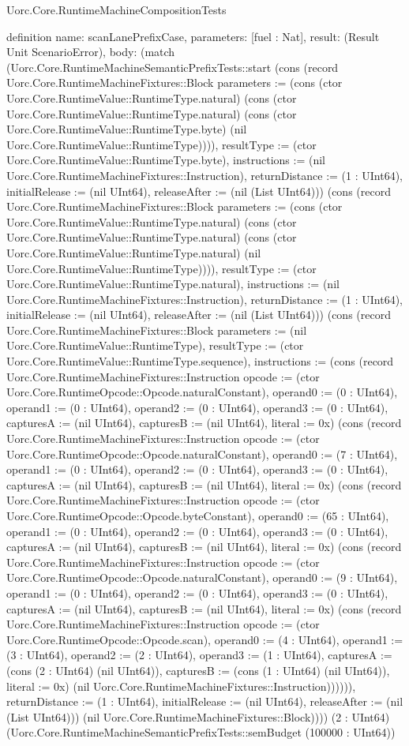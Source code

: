 \begin{lexlean}{Uorc.Core.RuntimeMachineCompositionTests}
\begin{semanticmodule}
definition{
  name: scanLanePrefixCase,
  parameters: [fuel : Nat],
  result: (Result Unit ScenarioError),
  body: (match (Uorc.Core.RuntimeMachineSemanticPrefixTests::start (cons (record Uorc.Core.RuntimeMachineFixtures::Block {parameters := (cons (ctor Uorc.Core.RuntimeValue::RuntimeType.natural) (cons (ctor Uorc.Core.RuntimeValue::RuntimeType.natural) (cons (ctor Uorc.Core.RuntimeValue::RuntimeType.byte) (nil Uorc.Core.RuntimeValue::RuntimeType)))), resultType := (ctor Uorc.Core.RuntimeValue::RuntimeType.byte), instructions := (nil Uorc.Core.RuntimeMachineFixtures::Instruction), returnDistance := (1 : UInt64), initialRelease := (nil UInt64), releaseAfter := (nil (List UInt64))}) (cons (record Uorc.Core.RuntimeMachineFixtures::Block {parameters := (cons (ctor Uorc.Core.RuntimeValue::RuntimeType.natural) (cons (ctor Uorc.Core.RuntimeValue::RuntimeType.natural) (cons (ctor Uorc.Core.RuntimeValue::RuntimeType.natural) (nil Uorc.Core.RuntimeValue::RuntimeType)))), resultType := (ctor Uorc.Core.RuntimeValue::RuntimeType.natural), instructions := (nil Uorc.Core.RuntimeMachineFixtures::Instruction), returnDistance := (1 : UInt64), initialRelease := (nil UInt64), releaseAfter := (nil (List UInt64))}) (cons (record Uorc.Core.RuntimeMachineFixtures::Block {parameters := (nil Uorc.Core.RuntimeValue::RuntimeType), resultType := (ctor Uorc.Core.RuntimeValue::RuntimeType.sequence), instructions := (cons (record Uorc.Core.RuntimeMachineFixtures::Instruction {opcode := (ctor Uorc.Core.RuntimeOpcode::Opcode.naturalConstant), operand0 := (0 : UInt64), operand1 := (0 : UInt64), operand2 := (0 : UInt64), operand3 := (0 : UInt64), capturesA := (nil UInt64), capturesB := (nil UInt64), literal := 0x}) (cons (record Uorc.Core.RuntimeMachineFixtures::Instruction {opcode := (ctor Uorc.Core.RuntimeOpcode::Opcode.naturalConstant), operand0 := (7 : UInt64), operand1 := (0 : UInt64), operand2 := (0 : UInt64), operand3 := (0 : UInt64), capturesA := (nil UInt64), capturesB := (nil UInt64), literal := 0x}) (cons (record Uorc.Core.RuntimeMachineFixtures::Instruction {opcode := (ctor Uorc.Core.RuntimeOpcode::Opcode.byteConstant), operand0 := (65 : UInt64), operand1 := (0 : UInt64), operand2 := (0 : UInt64), operand3 := (0 : UInt64), capturesA := (nil UInt64), capturesB := (nil UInt64), literal := 0x}) (cons (record Uorc.Core.RuntimeMachineFixtures::Instruction {opcode := (ctor Uorc.Core.RuntimeOpcode::Opcode.naturalConstant), operand0 := (9 : UInt64), operand1 := (0 : UInt64), operand2 := (0 : UInt64), operand3 := (0 : UInt64), capturesA := (nil UInt64), capturesB := (nil UInt64), literal := 0x}) (cons (record Uorc.Core.RuntimeMachineFixtures::Instruction {opcode := (ctor Uorc.Core.RuntimeOpcode::Opcode.scan), operand0 := (4 : UInt64), operand1 := (3 : UInt64), operand2 := (2 : UInt64), operand3 := (1 : UInt64), capturesA := (cons (2 : UInt64) (nil UInt64)), capturesB := (cons (1 : UInt64) (nil UInt64)), literal := 0x}) (nil Uorc.Core.RuntimeMachineFixtures::Instruction)))))), returnDistance := (1 : UInt64), initialRelease := (nil UInt64), releaseAfter := (nil (List UInt64))}) (nil Uorc.Core.RuntimeMachineFixtures::Block)))) (2 : UInt64) (Uorc.Core.RuntimeMachineSemanticPrefixTests::semBudget (100000 : UInt64)) }
\end{semanticmodule}
\end{lexlean}
